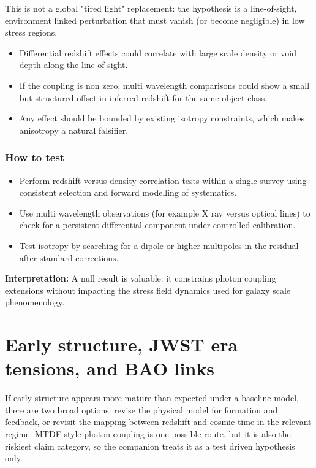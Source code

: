 \documentclass[11pt,a4paper]{article}
\begin{document}
This is not a global "tired light" replacement: the hypothesis is a line-of-sight, environment linked perturbation that must vanish (or become negligible) in low stress regions.

\begin{itemize}
  \item Differential redshift effects could correlate with large scale density or void depth along the line of sight.
  \item If the coupling is non zero, multi wavelength comparisons could show a small but structured offset in inferred redshift for the same object class.
  \item Any effect should be bounded by existing isotropy constraints, which makes anisotropy a natural falsifier.
\end{itemize}

\subsubsection{How to test}
\begin{itemize}
  \item Perform redshift versus density correlation tests within a single survey using consistent selection and forward modelling of systematics.
  \item Use multi wavelength observations (for example X ray versus optical lines) to check for a persistent differential component under controlled calibration.
  \item Test isotropy by searching for a dipole or higher multipoles in the residual after standard corrections.
\end{itemize}

\begin{mdframed}[linecolor=accent,linewidth=0.5pt,backgroundcolor=callout-bg,leftline=true,rightline=true,topline=true,bottomline=true,innerleftmargin=8pt,innerrightmargin=8pt,innertopmargin=6pt,innerbottommargin=6pt]
\textbf{Interpretation:} A null result is valuable: it constrains photon coupling extensions without impacting the stress field dynamics used for galaxy scale phenomenology.
\end{mdframed}

\section{Early structure, JWST era tensions, and BAO links}
\label{sec:early}
If early structure appears more mature than expected under a baseline model, there are two broad options: revise the physical model for formation and feedback, or revisit the mapping between redshift and cosmic time in the relevant regime.
MTDF style photon coupling is one possible route, but it is also the riskiest claim category, so the companion treats it as a test driven hypothesis only.
\end{document}

